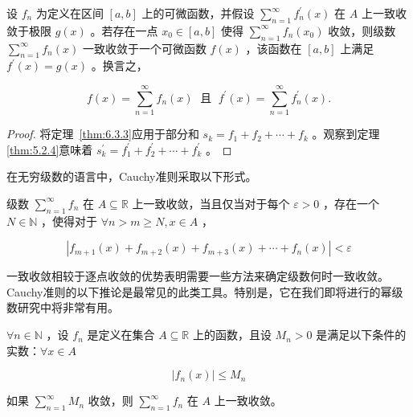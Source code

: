 \begin{Thm}\label{thm:6.4.3}
  设 \({f}_{n}\) 为定义在区间 \(\left\lbrack  {a,b}\right\rbrack\) 上的可微函数，并假设 \(\mathop{\sum }\limits_{{n = 1}}^{\infty }{f}_{n}^{\prime }\left( x\right)\) 在 \(A\) 上一致收敛于极限 \(g\left( x\right)\) 。若存在一点 \({x}_{0} \in  \left\lbrack  {a,b}\right\rbrack\) 使得 \(\mathop{\sum }\limits_{{n = 1}}^{\infty }{f}_{n}\left( {x}_{0}\right)\) 收敛，则级数 \(\mathop{\sum }\limits_{{n = 1}}^{\infty }{f}_{n}\left( x\right)\) 一致收敛于一个可微函数 \(f\left( x\right)\) ，该函数在 \(\left\lbrack  {a,b}\right\rbrack\) 上满足 \({f}^{\prime }\left( x\right)  = g\left( x\right)\) 。换言之，

\[
f\left( x\right)  = \mathop{\sum }\limits_{{n = 1}}^{\infty }{f}_{n}\left( x\right) \;\text{ 且 }\;{f}^{\prime }\left( x\right)  = \mathop{\sum }\limits_{{n = 1}}^{\infty }{f}_{n}^{\prime }\left( x\right) .
\]
\end{Thm}

\begin{proof}
 将定理~\ref{thm:6.3.3}应用于部分和 \({s}_{k} = {f}_{1} + {f}_{2} + \cdots  + {f}_{k}\) 。观察到定理\ref{thm:5.2.4}意味着 \({s}_{k}^{\prime } = {f}_{1}^{\prime } + {f}_{2}^{\prime } + \cdots  + {f}_{k}^{\prime }\) 。
\end{proof}

在无穷级数的语言中，Cauchy准则采取以下形式。

\begin{Thm}[级数一致收敛的Cauchy准则]
  \label{thm:6.4.4}
  级数 \(\mathop{\sum }\limits_{{n = 1}}^{\infty }{f}_{n}\) 在 \(A \subseteq  \mathbb{R}\) 上一致收敛，当且仅当对于每个 \(\varepsilon  > 0\) ，存在一个 \(N \in  \mathbb{N}\) ，使得对于 \(\forall n > m \geq  N, x\in A\) ，

\[
\left| {{f}_{m + 1}\left( x\right)  + {f}_{m + 2}\left( x\right)  + {f}_{m + 3}\left( x\right)  + \cdots  + {f}_{n}\left( x\right) }\right|  < \varepsilon
\]
\end{Thm}

一致收敛相较于逐点收敛的优势表明需要一些方法来确定级数何时一致收敛。Cauchy准则的以下推论是最常见的此类工具。特别是，它在我们即将进行的幂级数研究中将非常有用。

\begin{Cor}
  \label{cor:6.4.5}
   \(\forall n \in  \mathbb{N}\) ，设 \({f}_{n}\) 是定义在集合 \(A \subseteq  \mathbb{R}\) 上的函数，且设 \({M}_{n} > 0\) 是满足以下条件的实数：$\forall x\in A$

\[
\left| {{f}_{n}\left( x\right) }\right|  \leq  {M}_{n}
\]

如果 \(\mathop{\sum }\limits_{{n = 1}}^{\infty }{M}_{n}\) 收敛，则 \(\mathop{\sum }\limits_{{n = 1}}^{\infty }{f}_{n}\) 在 \(A\) 上一致收敛。
\end{Cor}

